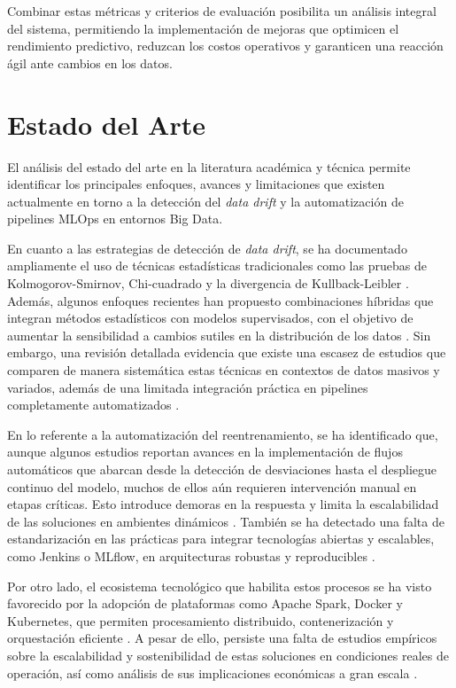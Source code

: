 Combinar estas métricas y criterios de evaluación posibilita un análisis integral del sistema, permitiendo la implementación de mejoras que optimicen el rendimiento predictivo, reduzcan los costos operativos y garanticen una reacción ágil ante cambios en los datos.

\section{Estado del Arte}

El análisis del estado del arte en la literatura académica y técnica permite identificar los principales enfoques, avances y limitaciones que existen actualmente en torno a la detección del \emph{data drift} y la automatización de pipelines MLOps en entornos Big Data.

En cuanto a las estrategias de detección de \textit{data drift}, se ha documentado ampliamente el uso de técnicas estadísticas tradicionales como las pruebas de Kolmogorov-Smirnov, Chi-cuadrado y la divergencia de Kullback-Leibler \citep{Chawla2021, Lu2019}. Además, algunos enfoques recientes han propuesto combinaciones híbridas que integran métodos estadísticos con modelos supervisados, con el objetivo de aumentar la sensibilidad a cambios sutiles en la distribución de los datos \citep{BaenaGarcia2006, Singh2023}. Sin embargo, una revisión detallada evidencia que existe una escasez de estudios que comparen de manera sistemática estas técnicas en contextos de datos masivos y variados, además de una limitada integración práctica en pipelines completamente automatizados \citep{Nguyen2023, Chatterjee2023}.

En lo referente a la automatización del reentrenamiento, se ha identificado que, aunque algunos estudios reportan avances en la implementación de flujos automáticos que abarcan desde la detección de desviaciones hasta el despliegue continuo del modelo, muchos de ellos aún requieren intervención manual en etapas críticas. Esto introduce demoras en la respuesta y limita la escalabilidad de las soluciones en ambientes dinámicos \citep{Amershi2019}. También se ha detectado una falta de estandarización en las prácticas para integrar tecnologías abiertas y escalables, como Jenkins o MLflow, en arquitecturas robustas y reproducibles \citep{RodriguezSimmhan2023, Kapoor2023, Abou2023, DeSousa2023}.

Por otro lado, el ecosistema tecnológico que habilita estos procesos se ha visto favorecido por la adopción de plataformas como Apache Spark, Docker y Kubernetes, que permiten procesamiento distribuido, contenerización y orquestación eficiente \citep{Chen2022, Merkel2014, Patel2020, Zhao2021}. A pesar de ello, persiste una falta de estudios empíricos sobre la escalabilidad y sostenibilidad de estas soluciones en condiciones reales de operación, así como análisis de sus implicaciones económicas a gran escala \citep{Xu2022, Lopez2022}.

